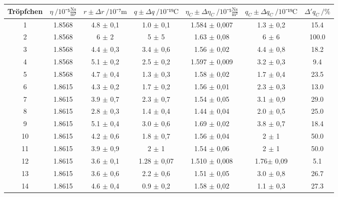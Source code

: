 \begin{landscape}
    \begin{table}
        \begin{center}
            \begin{tabular}{c S[table-format=1.4] S[table-format=1.1] S[table-format=1.2] S[table-format=1.3] S[table-format=1.2] S[table-format=3.1]}
		\toprule
		{Tröpfchen} & {$\eta\:/10⁻⁵\frac{\si{\newton\second}}{{\si\meter²}}$} &{$r\pm\Delta{r}\:/10⁻⁷\si\meter$}&{$q\pm\Delta{q}\:/10⁻¹⁹\si\coulomb$}&{$\eta_C\pm\Delta{\eta_C}\:/10⁻⁵\frac{\si{\newton\second}}{{\si\meter²}}$}&{$q_C\pm\Delta{q_C}\:/10⁻¹⁹\si\coulomb$}&{$\Delta'{q_C}\:/\%$} \\
		  & 1.8568  & 4.8 $\pm$ 0,1  & 1.0  $\pm$ 0,1  & 1.584  $\pm$ 0,007 &  1.3 $\pm$   0,2  &   15.4\\
 2  & 1.8568  & 6   $\pm$ 2    & 5    $\pm$ 5    & 1.63   $\pm$ 0,08  &  6   $\pm$   6    &  100.0\\
 3  & 1.8568  & 4.4 $\pm$ 0,3  & 3.4  $\pm$ 0,6  & 1.56   $\pm$ 0,02  &  4.4 $\pm$   0,8  &   18.2\\
 4  & 1.8568  & 5.1 $\pm$ 0,2  & 2.5  $\pm$ 0,2  & 1.597  $\pm$ 0,009 &  3.2 $\pm$   0,3  &    9.4\\
 5  & 1.8568  & 4.7 $\pm$ 0,4  & 1.3  $\pm$ 0,3  & 1.58   $\pm$ 0,02  &  1.7 $\pm$   0,4  &   23.5\\
 6  & 1.8615  & 4.3 $\pm$ 0,2  & 1.7  $\pm$ 0,2  & 1.56   $\pm$ 0,01  &  2.3 $\pm$   0,3  &   13.0\\
 7  & 1.8615  & 3.9 $\pm$ 0,7  & 2.3  $\pm$ 0,7  & 1.54   $\pm$ 0,05  &  3.1 $\pm$   0,9  &   29.0\\
 8  & 1.8615  & 2.8 $\pm$ 0,3  & 1.4  $\pm$ 0,4  & 1.44   $\pm$ 0,04  &  2.0 $\pm$   0,5  &   25.0\\
 9  & 1.8615  & 5.1 $\pm$ 0,4  & 3.0  $\pm$ 0,6  & 1.69   $\pm$ 0,02  &  3.8 $\pm$   0,7  &   18.4\\
10  & 1.8615  & 4.2 $\pm$ 0,6  & 1.8  $\pm$ 0,7  & 1.56   $\pm$ 0,04  &  2   $\pm$   1    &   50.0\\
11  & 1.8615  & 3.9 $\pm$ 0,9  & 2    $\pm$ 1    & 1.54   $\pm$ 0,06  &  2   $\pm$   1    &   50.0\\
12  & 1.8615  & 3.6 $\pm$ 0,1  & 1.28 $\pm$ 0,07 & 1.510  $\pm$ 0,008 &  1.76$\pm$   0,09 &    5.1\\
13  & 1.8615  & 3.6 $\pm$ 0,6  & 2.2  $\pm$ 0,6  & 1.51   $\pm$ 0,05  &  3.0 $\pm$   0,8  &   26.7\\
14  & 1.8615  & 4.6 $\pm$ 0,4  & 0.9  $\pm$ 0,2  & 1.58   $\pm$ 0,02  &  1.1 $\pm$   0,3  &   27.3\\

\end{tabular}
\end{center}
\end{table}
\end{landscape}
